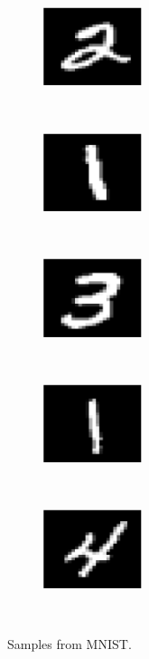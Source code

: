 \documentclass[a4paper,11pt]{report}
\begin{document}
\begin{figure}[h]
\begin{subfigure}[t]{0.17\textwidth}
				\centering
				\includegraphics[height=0.9in]{mnist_6.eps}
			\end{subfigure}%
			~ 
			\begin{subfigure}[t]{0.17\textwidth}
        \centering
        \includegraphics[height=0.9in]{mnist_7.eps}
			\end{subfigure}
			~ 
			\begin{subfigure}[t]{0.17\textwidth}
        \centering
        \includegraphics[height=0.9in]{mnist_8.eps}
			\end{subfigure}
			~ 
			\begin{subfigure}[t]{0.17\textwidth}
        \centering
        \includegraphics[height=0.9in]{mnist_9.eps}
			\end{subfigure}
			~ 
			\begin{subfigure}[t]{0.17\textwidth}
        \centering
        \includegraphics[height=0.9in]{mnist_10.eps}
			\end{subfigure}
			~
			\caption{Samples from MNIST.}
			\label{fig:Mnist}
		\end{figure}
		
\end{document}
